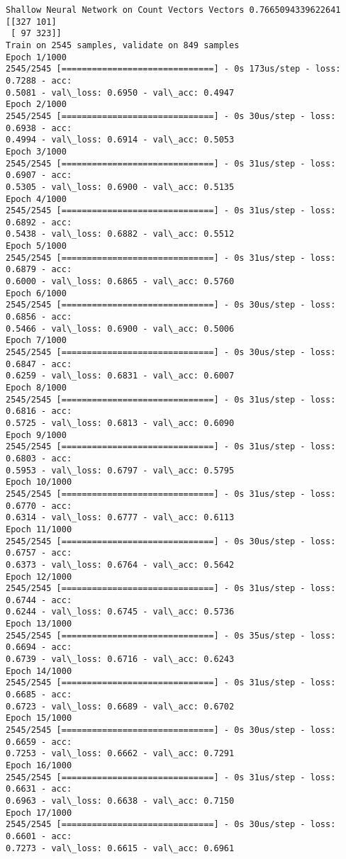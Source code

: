 \documentclass[11pt]{article}
\begin{document}
    \begin{Verbatim}[commandchars=\\\{\}]
Shallow Neural Network on Count Vectors Vectors 0.7665094339622641
[[327 101]
 [ 97 323]]
Train on 2545 samples, validate on 849 samples
Epoch 1/1000
2545/2545 [==============================] - 0s 173us/step - loss: 0.7288 - acc:
0.5081 - val\_loss: 0.6950 - val\_acc: 0.4947
Epoch 2/1000
2545/2545 [==============================] - 0s 30us/step - loss: 0.6938 - acc:
0.4994 - val\_loss: 0.6914 - val\_acc: 0.5053
Epoch 3/1000
2545/2545 [==============================] - 0s 31us/step - loss: 0.6907 - acc:
0.5305 - val\_loss: 0.6900 - val\_acc: 0.5135
Epoch 4/1000
2545/2545 [==============================] - 0s 31us/step - loss: 0.6892 - acc:
0.5438 - val\_loss: 0.6882 - val\_acc: 0.5512
Epoch 5/1000
2545/2545 [==============================] - 0s 31us/step - loss: 0.6879 - acc:
0.6000 - val\_loss: 0.6865 - val\_acc: 0.5760
Epoch 6/1000
2545/2545 [==============================] - 0s 30us/step - loss: 0.6856 - acc:
0.5466 - val\_loss: 0.6900 - val\_acc: 0.5006
Epoch 7/1000
2545/2545 [==============================] - 0s 30us/step - loss: 0.6847 - acc:
0.6259 - val\_loss: 0.6831 - val\_acc: 0.6007
Epoch 8/1000
2545/2545 [==============================] - 0s 31us/step - loss: 0.6816 - acc:
0.5725 - val\_loss: 0.6813 - val\_acc: 0.6090
Epoch 9/1000
2545/2545 [==============================] - 0s 31us/step - loss: 0.6803 - acc:
0.5953 - val\_loss: 0.6797 - val\_acc: 0.5795
Epoch 10/1000
2545/2545 [==============================] - 0s 31us/step - loss: 0.6770 - acc:
0.6314 - val\_loss: 0.6777 - val\_acc: 0.6113
Epoch 11/1000
2545/2545 [==============================] - 0s 30us/step - loss: 0.6757 - acc:
0.6373 - val\_loss: 0.6764 - val\_acc: 0.5642
Epoch 12/1000
2545/2545 [==============================] - 0s 31us/step - loss: 0.6744 - acc:
0.6244 - val\_loss: 0.6745 - val\_acc: 0.5736
Epoch 13/1000
2545/2545 [==============================] - 0s 35us/step - loss: 0.6694 - acc:
0.6739 - val\_loss: 0.6716 - val\_acc: 0.6243
Epoch 14/1000
2545/2545 [==============================] - 0s 31us/step - loss: 0.6685 - acc:
0.6723 - val\_loss: 0.6689 - val\_acc: 0.6702
Epoch 15/1000
2545/2545 [==============================] - 0s 30us/step - loss: 0.6659 - acc:
0.7253 - val\_loss: 0.6662 - val\_acc: 0.7291
Epoch 16/1000
2545/2545 [==============================] - 0s 31us/step - loss: 0.6631 - acc:
0.6963 - val\_loss: 0.6638 - val\_acc: 0.7150
Epoch 17/1000
2545/2545 [==============================] - 0s 30us/step - loss: 0.6601 - acc:
0.7273 - val\_loss: 0.6615 - val\_acc: 0.6961

\end{Verbatim}
\end{document}
